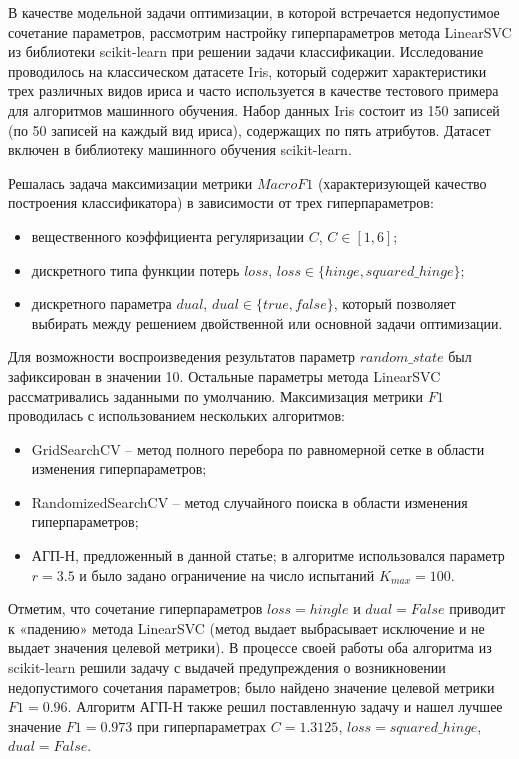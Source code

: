 \documentclass[a4paper,12pt,russian]{article}
\begin{document}
В качестве модельной задачи оптимизации, в которой встречается недопустимое сочетание параметров, рассмотрим настройку гиперпараметров метода LinearSVC из библиотеки scikit-learn при решении задачи классификации. Исследование проводилось на классическом датасете Iris, который содержит характеристики трех различных видов ириса и часто используется в качестве тестового примера для алгоритмов машинного обучения. Набор данных Iris состоит из 150 записей (по 50 записей на каждый вид ириса), содержащих по пять атрибутов. Датасет включен в библиотеку машинного обучения scikit-learn.

Решалась задача максимизации метрики $Macro F1$ (характеризующей качество построения классификатора) в зависимости от трех гиперпараметров:
\begin{itemize}
\item вещественного коэффициента регуляризации $C$, $C \in [1,6]$;
\item дискретного типа функции потерь $loss$, $loss \in \{hinge, squared\_hinge\}$;
\item дискретного параметра $dual$, $dual \in \{true, false\}$, который позволяет выбирать между решением двойственной или основной задачи оптимизации.
\end{itemize}

Для возможности воспроизведения результатов параметр $random\_state$ был зафиксирован в значении 10. Остальные параметры метода LinearSVC рассматривались заданными по умолчанию. Максимизация метрики $F1$ проводилась с использованием нескольких алгоритмов:
\begin{itemize}
\item GridSearchCV -- метод полного перебора по равномерной сетке в области изменения гиперпараметров;
\item  RandomizedSearchCV -- метод случайного поиска в области изменения гиперпараметров;
\item  АГП-Н, предложенный в данной статье; в алгоритме использовался параметр $r=3.5$ и было задано ограничение на число испытаний $K_{max}=100$.
\end{itemize}
 
Отметим, что сочетание гиперпараметров $loss = hingle$ и $dual = False$ приводит к «падению» метода LinearSVC (метод выдает выбрасывает исключение и не выдает значения целевой метрики). В процессе своей работы оба алгоритма из scikit-learn решили задачу с выдачей предупреждения о возникновении недопустимого сочетания параметров; было найдено значение целевой метрики $F1 = 0.96$.
Алгоритм АГП-Н также решил поставленную задачу и нашел лучшее значение $F1 = 0.973$ при гиперпараметрах $C=1.3125$, $loss=squared\_hinge$, $dual = False$.
\end{document}
